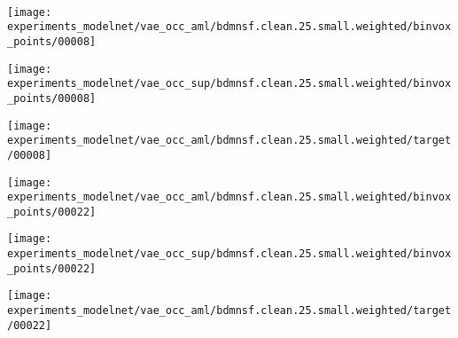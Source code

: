 \begin{minipage}[t]{0.95\textwidth}
    \\
    \begin{minipage}[t]{0.155\textwidth}
        \vspace{0px}
        \centering
        \texttt{[image: experiments\_modelnet/vae\_occ\_aml/bdmnsf.clean.25.small.weighted/binvox\_points/00008]}
    \end{minipage}
    \begin{minipage}[t]{0.155\textwidth}
        \vspace{0px}
        \centering
        \texttt{[image: experiments\_modelnet/vae\_occ\_sup/bdmnsf.clean.25.small.weighted/binvox\_points/00008]}
    \end{minipage}
    \begin{minipage}[t]{0.155\textwidth}
        \vspace{0px}
        \centering
        \texttt{[image: experiments\_modelnet/vae\_occ\_aml/bdmnsf.clean.25.small.weighted/target/00008]}
    \end{minipage}
    \begin{minipage}[t]{0.155\textwidth}
        \vspace{0px}
        \centering
        \texttt{[image: experiments\_modelnet/vae\_occ\_aml/bdmnsf.clean.25.small.weighted/binvox\_points/00022]}
    \end{minipage}
    \begin{minipage}[t]{0.155\textwidth}
        \vspace{0px}
        \centering
        \texttt{[image: experiments\_modelnet/vae\_occ\_sup/bdmnsf.clean.25.small.weighted/binvox\_points/00022]}
    \end{minipage}
    \begin{minipage}[t]{0.155\textwidth}
        \vspace{0px}
        \centering
        \texttt{[image: experiments\_modelnet/vae\_occ\_aml/bdmnsf.clean.25.small.weighted/target/00022]}
    \end{minipage}
\end{minipage}